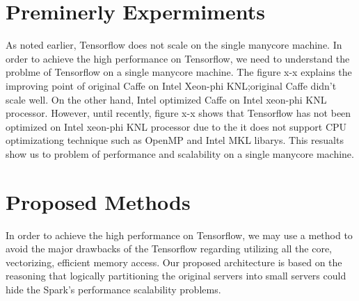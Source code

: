 \documentclass{IOS-Book-Article}
\begin{document}
\section{Preminerly Expermiments}
As noted earlier, Tensorflow does not scale on the single manycore machine.
In order to achieve the high performance on Tensorflow, we need to understand 
the problme of Tensorflow on a single manycore machine.
The figure x-x explains the improving point of original Caffe on Intel Xeon-phi
KNL;original Caffe didn't scale well.
On the other hand, Intel optimized Caffe on Intel xeon-phi KNL processor.
However, until recently, figure x-x shows that Tensorflow has not been 
optimized on Intel xeon-phi KNL processor due to the it does not support CPU
optimizationg technique such as OpenMP and Intel MKL libarys.
This resualts show us to problem of performance and scalability on a single
manycore machine.

\section{Proposed Methods}
In order to achieve the high performance on Tensorflow, we may use a method 
to avoid the major drawbacks of the Tensorflow regarding utilizing all the
core, vectorizing, efficient memory access.
Our proposed architecture is based on the reasoning that logically partitioning
the original servers into small servers could hide the Spark's performance
scalability problems.
 


 




\end{document}
